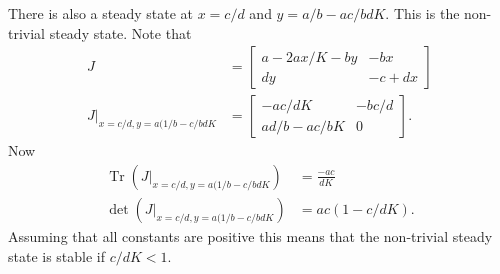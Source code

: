 \documentclass{unswmaths}
\begin{document}
There is also a steady state at $ x = c / d $ and $ y = a / b - ac / bdK $. 
This is the non-trivial steady state.
Note that
\begin{align*}
    J &= \left[ \begin{array}{cc} a - 2a x / K - by & -bx \\ dy & -c + dx \end{array}\right] \\
    J \big|_{x = c/d, y = a(1/b - c/bdK} &= \left[ \begin{array}{cc} -ac / dK & -bc / d \\ ad / b - ac /bK & 0 \end{array} \right].
\end{align*}
Now 
\begin{align*}
    \operatorname{Tr}\left( J \big|_{x = c/d, y = a(1/b - c/bdK} \right) &= \frac{-ac}{dK}  \\
    \operatorname{det}\left(  J \big|_{x = c/d, y = a(1/b - c/bdK} \right) &= ac\left( 1 - c / dK \right).
\end{align*}
Assuming that all constants are positive this means that the non-trivial steady state is stable if $ c/dK < 1 $. 
\end{document}
